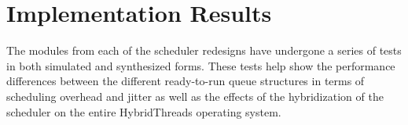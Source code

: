 \chapter{Implementation Results}
\label{sec:results}

The modules from each of the scheduler redesigns have undergone a series of
tests in both simulated and synthesized forms.  These tests help show the
performance differences between the different ready-to-run queue structures in
terms of scheduling overhead and jitter as well as the effects of the
hybridization of the scheduler on the entire HybridThreads operating system. 




